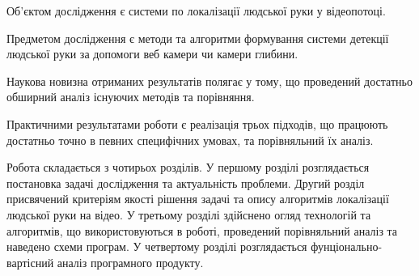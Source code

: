Об'єктом дослідження є системи по локалізації людської руки у відеопотоці.

Предметом дослідження є методи та алгоритми формування системи детекції людської руки за допомоги веб камери чи камери глибини.

Наукова новизна отриманих результатів полягає у тому, що проведений достатньо обширний аналіз існуючих методів та порівняння. 

Практичними результатами роботи є реалізація трьох підходів, що працюють достатньо точно в певних специфічних умовах, та порівняльний їх аналіз.

Робота складається з чотирьох розділів. У першому розділі розглядається постановка задачі дослідження та актуальність проблеми. Другий розділ присвячений критеріям якості рішення задачі та опису алгоритмів локалізації людської руки на відео. У третьому розділі здійснено огляд технологій та алгоритмів, що використовуються в роботі, проведений порівняльний аналіз та наведено схеми програм. У четвертому розділі розглядається фунціонально-вартісний аналіз програмного продукту.
